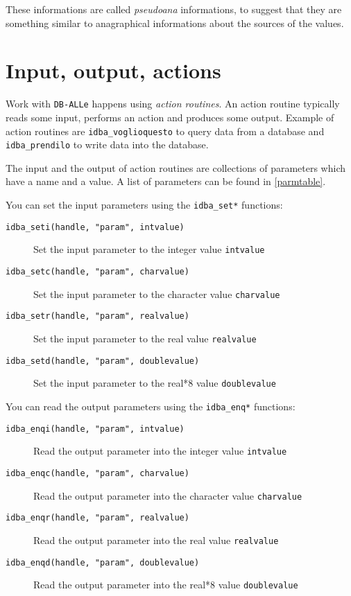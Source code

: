 \documentclass[final,12pt,a4paper,twoside]{book}
\newcommand{\dballe}{{\tt DB-ALLe}}
\begin{document}
These informations are called \emph{pseudoana} informations, to suggest that
they are something similar to anagraphical informations about the sources of
the values.


\section {Input, output, actions}
\label{basics-inout}

Work with \dballe{} happens using \emph{action routines}.  An action routine
typically reads some input, performs an action and produces some output.
Example of action routines are {\tt idba\_voglioquesto} to query data from a
database and {\tt idba\_prendilo} to write data into the database.

The input and the output of action routines are collections of parameters which
have a name and a value.  A list of parameters can be found in
\ref{parmtable}.

You can set the input parameters using the {\tt idba\_set*} functions:
\label{fun-idba_set}

\begin{description}
\item[{\tt idba\_seti(handle, "param", intvalue)}]
  Set the input parameter to the integer value {\tt intvalue}

\item[{\tt idba\_setc(handle, "param", charvalue)}]
  Set the input parameter to the character value {\tt charvalue}

\item[{\tt idba\_setr(handle, "param", realvalue)}]
  Set the input parameter to the real value {\tt realvalue}

\item[{\tt idba\_setd(handle, "param", doublevalue)}]
  Set the input parameter to the real*8 value {\tt doublevalue}
\end{description}

You can read the output parameters using the {\tt idba\_enq*} functions:
\label{fun-idba_enq}

\begin{description}
\item[{\tt idba\_enqi(handle, "param", intvalue)}]
  Read the output parameter into the integer value {\tt intvalue}

\item[{\tt idba\_enqc(handle, "param", charvalue)}]
  Read the output parameter into the character value {\tt charvalue}

\item[{\tt idba\_enqr(handle, "param", realvalue)}]
  Read the output parameter into the real value {\tt realvalue}

\item[{\tt idba\_enqd(handle, "param", doublevalue)}]
  Read the output parameter into the real*8 value {\tt doublevalue}
\end{description}
\end{document}

